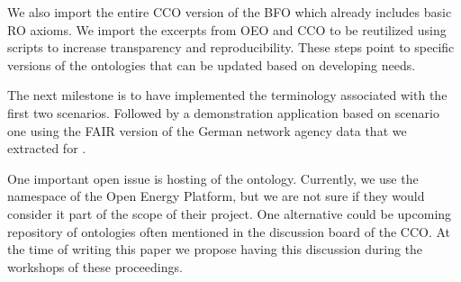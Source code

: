 We also import the entire CCO version of the BFO which already
includes basic RO axioms. We import  the excerpts from OEO and CCO to be
reutilized using scripts to increase transparency and reproducibility. These
steps point to specific versions of the ontologies that can be updated based on
developing needs. 

The next milestone is to have implemented the terminology associated with the
first two scenarios. Followed by a demonstration application based on scenario
one using the FAIR version of the German network agency data that we extracted
for \cite{ArellanoRuiz.2024}.

One important open issue is hosting of the ontology. Currently, we use the
namespace of the Open Energy Platform, but we are not sure if they would
consider it part of the scope of their project. One alternative could be
upcoming repository of ontologies often mentioned in the discussion board of
the CCO. At the time of writing this paper we propose having this discussion
during the workshops of these proceedings.




    